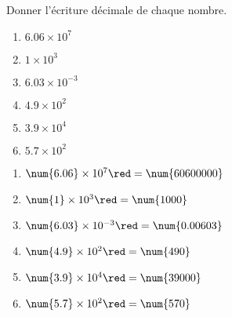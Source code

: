 \begin{exercice*}    
    Donner l'écriture décimale de chaque nombre.
    \begin{multicols}{2}
        \begin{enumerate}
            \item $\num{6.06}\times 10^{7}$
            \item $\num{1}   \times 10^{3}$
            \item $\num{6.03}\times 10^{-3}$
            \item $\num{4.9} \times 10^{2}$
            \item $\num{3.9} \times 10^{4}$
            \item $\num{5.7} \times 10^{2}$
        \end{enumerate}
    \end{multicols}
    
\end{exercice*}
\begin{corrige}
    \begin{enumerate}
        \item $\num{6.06}\times 10^{7} {\red = \num{60600000}}$
        \item $\num{1}   \times 10^{3} {\red = \num{1000}}$
        \item $\num{6.03}\times 10^{-3}{\red = \num{0.00603}}$
        \item $\num{4.9} \times 10^{2} {\red = \num{490}}$
        \item $\num{3.9} \times 10^{4} {\red = \num{39000}}$
        \item $\num{5.7} \times 10^{2} {\red = \num{570}}$
    \end{enumerate}
\end{corrige}

